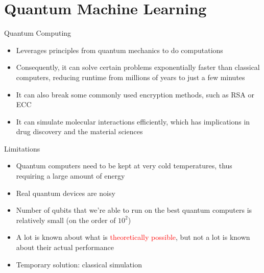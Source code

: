 \documentclass[xcolor=dvipsnames]{beamer}
\begin{document}
\section{Quantum Machine Learning}

\begin{frame}{Quantum Computing}
  
  \begin{itemize}
    \item Leverages principles from quantum mechanics to do computations
    \item Consequently, it can solve certain problems exponentially faster than classical computers, reducing runtime from millions of years to just a few minutes
    \item It can also break some commonly used encryption methods, such as RSA or ECC
    \item It can simulate molecular interactions efficiently, which has implications in drug discovery and the material sciences
  \end{itemize}

\end{frame}

\begin{frame}{Limitations}

  \begin{itemize}
    \item Quantum computers need to be kept at very cold temperatures, thus requiring a large amount of energy
    \item Real quantum devices are noisy
    \item Number of qubits that we're able to run on the best quantum computers is relatively small (on the order of $10^2$)
    \item A lot is known about what is \textcolor{red}{theoretically possible}, but not a lot is known about their actual performance 
    \item Temporary solution: classical simulation 
  \end{itemize}
  
\end{frame}
\end{document}
